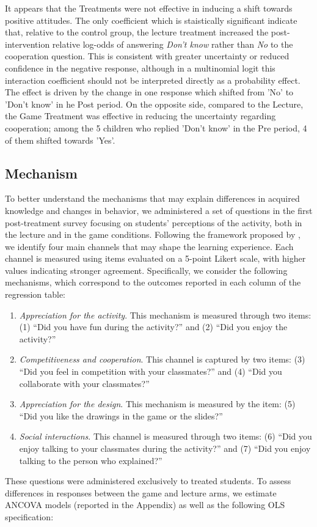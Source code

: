 \documentclass[preprint,12pt]{elsarticle}
\begin{document}
It appears that the Treatments were not effective in inducing a shift towards positive attitudes. The only coefficient which is staistically significant indicate that, relative to the control group, the lecture treatment increased the post-intervention relative log-odds of answering \textit{Don't know} rather than \textit{No} to the cooperation question. This is consistent with greater uncertainty or reduced confidence in the negative response, although in a multinomial logit this interaction coefficient should not be interpreted directly as a probability effect. The effect is driven by the change in one response which shifted from 'No' to 'Don't know' in he Post period. On the opposite side, compared to the Lecture, the Game Treatment was effective in reducing the uncertainty regarding cooperation; among the 5 children who replied 'Don't know' in the Pre period, 4 of them shifted towards 'Yes'.




\subsection{Mechanism}

To better understand the mechanisms that may explain differences in acquired knowledge and changes in behavior, we administered a set of questions in the first post-treatment survey focusing on students’ perceptions of the activity, both in the lecture and in the game conditions. Following the framework proposed by \cite{mayer2012towards}, we identify four main channels that may shape the learning experience. Each channel is measured using items evaluated on a 5-point Likert scale, with higher values indicating stronger agreement.
Specifically, we consider the following mechanisms, which correspond to the outcomes reported in each column of the regression table:
\begin{enumerate}
\item \textit{Appreciation for the activity}. This mechanism is measured through two items:
(1) “Did you have fun during the activity?” and
(2) “Did you enjoy the activity?”

\item \textit{Competitiveness and cooperation}. This channel is captured by two items:  
(3) “Did you feel in competition with your classmates?” and  
(4) “Did you collaborate with your classmates?”  

\item \textit{Appreciation for the design}. This mechanism is measured by the item:  
(5) “Did you like the drawings in the game or the slides?”  

\item \textit{Social interactions}. This channel is measured through two items:  
(6) “Did you enjoy talking to your classmates during the activity?” and  
(7) “Did you enjoy talking to the person who explained?”
\end{enumerate}
These questions were administered exclusively to treated students. To assess differences in responses between the game and lecture arms, we estimate ANCOVA models (reported in the Appendix) as well as the following OLS specification:
\end{document}
